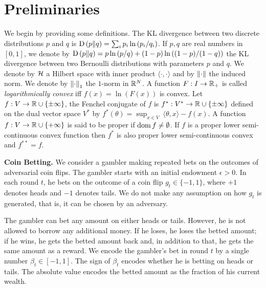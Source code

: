 
\section{Preliminaries}
\label{section:preliminaries}

We begin by providing some definitions.
The \ac{KL} divergence between two discrete distributions $p$ and $q$ is
$\operatorname{D}\left({p}\middle\|{q}\right) = \sum_{i} p_i \ln\left( p_i/q_i \right)$. If $p,q$ are real numbers
in $[0,1]$, we denote by $\operatorname{D}\left({p}\middle\|{q}\right) = p \ln \left(p/q \right) + (1-p) \ln
\left((1-p)/(1-q) \right)$ the \ac{KL} divergence between two Bernoulli
distributions with parameters $p$ and $q$.  We denote by $\mathcal{H}$ a Hilbert space
with inner product $\langle \cdot, \cdot\rangle$ and by $\left\|{\cdot}\right\|$ the
induced norm.  We denote by $\left\|{\cdot}\right\|_1$ the $1$-norm in $\mathbb{R}^N$.  A
function $F:I \to \mathbb{R}_+$ is called \emph{logarithmically convex} iff $f(x) =
\ln(F(x))$ is convex.  Let $f:V \to \mathbb{R} \cup \{\pm\infty\}$, the Fenchel
conjugate of $f$ is $f^*:V^* \to \mathbb{R} \cup \{\pm \infty\}$ defined on the dual
vector space $V^*$ by $f^*(\theta) = \sup_{x \in V} \ \langle \theta, x \rangle
- f(x)$.  A function $f:V \to \mathbb{R} \cup \{+ \infty\}$ is said to be proper if
$\operatorname*{dom} f \neq \emptyset$.  If $f$ is a proper lower semi-continuous convex
function then $f^*$ is also proper lower semi-continuous convex and
$f^{**}=f$.

\textbf{Coin Betting.} We consider a gambler making
repeated bets on the outcomes of adversarial coin flips. The gambler starts with an
initial endowment $\epsilon > 0$. In each round $t$, he bets on the outcome of a
coin flip $g_t \in \{-1,1\}$, where $+1$ denotes heads and $-1$ denotes tails.
We do not make any assumption on how $g_t$ is generated, that is, it can be
chosen by an adversary.

The gambler can bet any amount on either heads or tails. However, he is not
allowed to borrow any additional money. If he loses, he loses the betted
amount; if he wins, he gets the betted amount back and, in addition to that, he
gets the same amount as a reward.  We encode the gambler's bet in round $t$ by a
single number $\beta_t \in [-1,1]$. The sign of $\beta_t$ encodes whether he is
betting on heads or tails. The absolute value encodes the betted amount as the
fraction of his current wealth.

